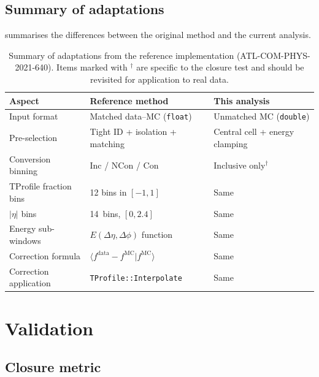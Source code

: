 \documentclass[12pt,a4paper]{article}
\begin{document}
\subsection{Summary of adaptations}
\label{sec:adaptations:summary}

 summarises the differences between the original
method and the current analysis.

\begin{table}[htbp]
\centering
\caption{Summary of adaptations from the reference implementation (ATL-COM-PHYS-2021-640).
  Items marked with $^\dagger$ are specific to the closure test and should be
  revisited for application to real data.}
\label{tab:adaptations}
\small
\begin{tabular}{lll}
\toprule
\textbf{Aspect} & \textbf{Reference method} & \textbf{This analysis} \\
\midrule
Input format          & Matched data--MC (\texttt{float}) & Unmatched MC (\texttt{double}) \\
Pre-selection         & Tight ID + isolation + matching     & Central cell + energy clamping \\
Conversion binning    & Inc / NCon / Con                    & Inclusive only$^\dagger$ \\
TProfile fraction bins & 12 bins in $[-1, 1]$              & Same \\
$|\eta|$ bins         & 14~bins, $[0, 2.4]$                & Same \\
Energy sub-windows    & $E(\Delta\eta, \Delta\phi)$ function & Same \\
Correction formula    & $\langle f^\text{data} {-} f^\text{MC} | f^\text{MC}\rangle$ & Same \\
Correction application & \texttt{TProfile::Interpolate}    & Same \\
\bottomrule
\end{tabular}
\end{table}

\section{Validation}
\label{sec:validation}

\subsection{Closure metric}
\label{sec:validation:metric}
\end{document}
